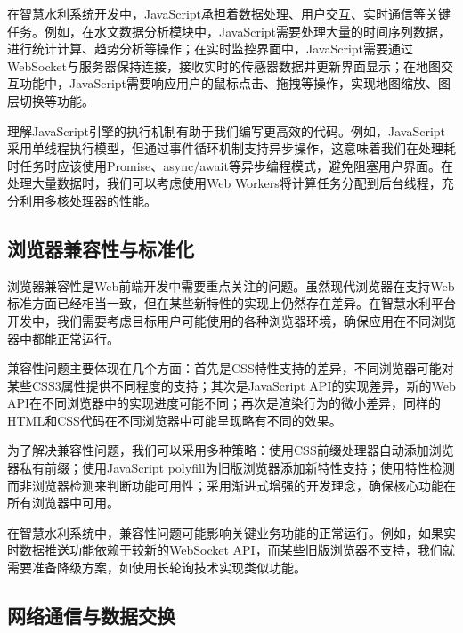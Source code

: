 在智慧水利系统开发中，JavaScript承担着数据处理、用户交互、实时通信等关键任务。例如，在水文数据分析模块中，JavaScript需要处理大量的时间序列数据，进行统计计算、趋势分析等操作；在实时监控界面中，JavaScript需要通过WebSocket与服务器保持连接，接收实时的传感器数据并更新界面显示；在地图交互功能中，JavaScript需要响应用户的鼠标点击、拖拽等操作，实现地图缩放、图层切换等功能。

理解JavaScript引擎的执行机制有助于我们编写更高效的代码。例如，JavaScript采用单线程执行模型，但通过事件循环机制支持异步操作，这意味着我们在处理耗时任务时应该使用Promise、async/await等异步编程模式，避免阻塞用户界面。在处理大量数据时，我们可以考虑使用Web Workers将计算任务分配到后台线程，充分利用多核处理器的性能。

\hypertarget{ux6d4fux89c8ux5668ux517cux5bb9ux6027ux4e0eux6807ux51c6ux5316}{%
\subsection{浏览器兼容性与标准化}\label{ux6d4fux89c8ux5668ux517cux5bb9ux6027ux4e0eux6807ux51c6ux5316}}

浏览器兼容性是Web前端开发中需要重点关注的问题。虽然现代浏览器在支持Web标准方面已经相当一致，但在某些新特性的实现上仍然存在差异。在智慧水利平台开发中，我们需要考虑目标用户可能使用的各种浏览器环境，确保应用在不同浏览器中都能正常运行。

兼容性问题主要体现在几个方面：首先是CSS特性支持的差异，不同浏览器可能对某些CSS3属性提供不同程度的支持；其次是JavaScript API的实现差异，新的Web API在不同浏览器中的实现进度可能不同；再次是渲染行为的微小差异，同样的HTML和CSS代码在不同浏览器中可能呈现略有不同的效果。

为了解决兼容性问题，我们可以采用多种策略：使用CSS前缀处理器自动添加浏览器私有前缀；使用JavaScript polyfill为旧版浏览器添加新特性支持；使用特性检测而非浏览器检测来判断功能可用性；采用渐进式增强的开发理念，确保核心功能在所有浏览器中可用。

 在智慧水利系统中，兼容性问题可能影响关键业务功能的正常运行。例如，如果实时数据推送功能依赖于较新的WebSocket API，而某些旧版浏览器不支持，我们就需要准备降级方案，如使用长轮询技术实现类似功能。

\hypertarget{ux7f51ux7edcux901aux4fe1ux4e0eux6570ux636eux4ea4ux6362}{%
\subsection{网络通信与数据交换}\label{ux7f51ux7edcux901aux4fe1ux4e0eux6570ux636eux4ea4ux6362}}

